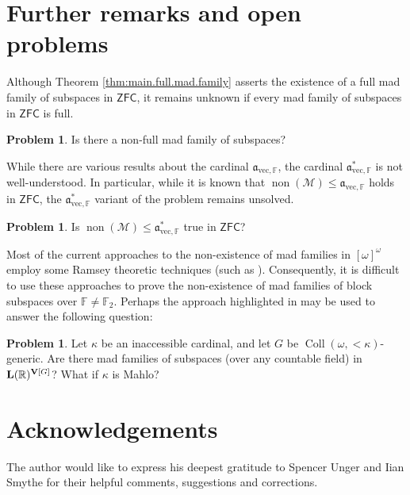 \documentclass[10pt,a4paper]{amsart}
\theoremstyle{plain}
\numberwithin{equation}{section}
\theoremstyle{definition}
\newtheorem{prob}[theorem]{Problem}
\newcommand{\func}{\operatorname}
\newcommand{\R}{\mathbb{R}}
\renewcommand{\frak}{\mathfrak}
\renewcommand{\bf}{\mathbf}
\newcommand{\ZFC}{\mathsf{ZFC}}
\newcommand{\non}{\func{non}}
\newcommand{\Coll}{\func{Coll}}
\newcommand{\M}{\mathcal{M}}
\newcommand{\V}{\bf{V}}
\newcommand{\avec}{\frak{a}_{\mathrm{vec},\mathbb{F}}}
\let\strokeL\L
\DeclareRobustCommand{\L}{\ifmmode\mathbf{L}\else\strokeL\fi}
\begin{document}
\section{Further remarks and open problems}
\label{sec:conclusion}
Although Theorem \ref{thm:main.full.mad.family} asserts the existence of a full mad family of subspaces in $\ZFC$, it remains unknown if every mad family of subspaces in $\ZFC$ is full.

\begin{prob}
    Is there a non-full mad family of subspaces?
\end{prob}

While there are various results about the cardinal $\avec$, the cardinal $\avec^*$ is not well-understood. In particular, while it is known that $\non(\M) \leq \avec$ holds in $\ZFC$, the $\avec^*$ variant of the problem remains unsolved.

\begin{prob}
    Is $\non(\M) \leq \avec^*$ true in $\ZFC$?
\end{prob}

Most of the current approaches to the non-existence of mad families in $[\omega]^\omega$ employ some Ramsey theoretic techniques (such as \cite{M77} \cite{NN18} \cite{ST19}). Consequently, it is difficult to use these approaches to prove the non-existence of mad families of block subspaces over $\mathbb{F} \neq \mathbb{F}_2$. Perhaps the approach highlighted in \cite{T18} may be used to answer the following question:

\begin{prob}
    Let $\kappa$ be an inaccessible cardinal, and let $G$ be $\Coll(\omega,<\!\kappa)$-generic. Are there mad families of subspaces (over any countable field) in $\L(\R)^{\V[G]}$? What if $\kappa$ is Mahlo?
\end{prob}

\section*{Acknowledgements}
The author would like to express his deepest gratitude to Spencer Unger and Iian Smythe for their helpful comments, suggestions and corrections.




\end{document}
